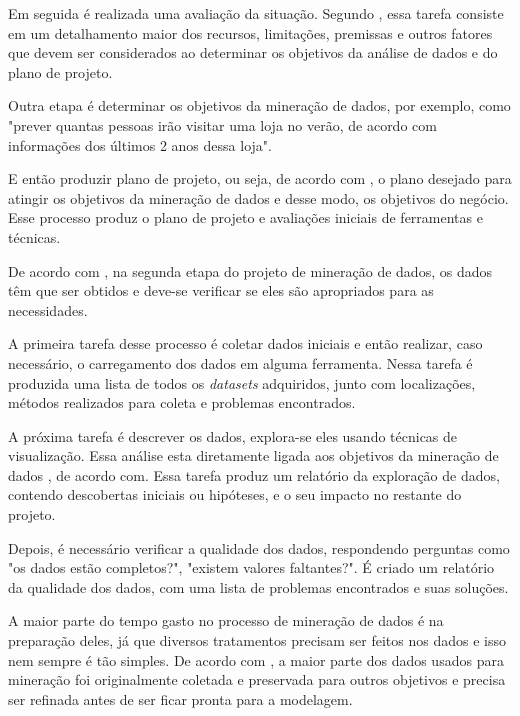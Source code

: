 Em seguida é realizada uma avaliação da situação. Segundo , essa tarefa consiste em um detalhamento maior dos recursos, limitações, premissas e outros fatores que devem ser considerados ao determinar os objetivos da análise de dados e do plano de projeto.

Outra etapa é determinar os objetivos da mineração de dados, por exemplo, como "prever quantas pessoas irão visitar uma loja no verão, de acordo com informações dos últimos 2 anos dessa loja".

E então produzir plano de projeto, ou seja, de acordo com , o plano desejado para atingir os objetivos da mineração de dados e desse modo, os objetivos do negócio. Esse processo produz o plano de projeto e avaliações iniciais de ferramentas e técnicas.

De acordo com , na segunda etapa do projeto de mineração de dados, os dados têm que ser obtidos e deve-se verificar se eles são apropriados para as necessidades.

A primeira tarefa desse processo é coletar dados iniciais e então realizar, caso necessário, o carregamento dos dados em alguma ferramenta. Nessa tarefa é produzida uma lista de todos os \textit{datasets} adquiridos, junto com localizações, métodos realizados para coleta e problemas encontrados.

A próxima tarefa é descrever os dados, explora-se eles usando técnicas de visualização. Essa análise esta diretamente ligada aos objetivos da mineração de dados , de acordo com. Essa tarefa produz um relatório da exploração de dados, contendo descobertas iniciais ou hipóteses, e o seu impacto no restante do projeto.

Depois, é necessário verificar a qualidade dos dados, respondendo perguntas como "os dados estão completos?", "existem valores faltantes?". É criado um relatório da qualidade dos dados, com uma lista de problemas encontrados e suas soluções.

A maior parte do tempo gasto no processo de mineração de dados é na preparação deles, já que diversos tratamentos precisam ser feitos nos dados e isso nem sempre é tão simples. De acordo com , a maior parte dos dados usados para mineração foi originalmente coletada e preservada para outros objetivos e precisa ser refinada antes de ser ficar pronta para a modelagem.

